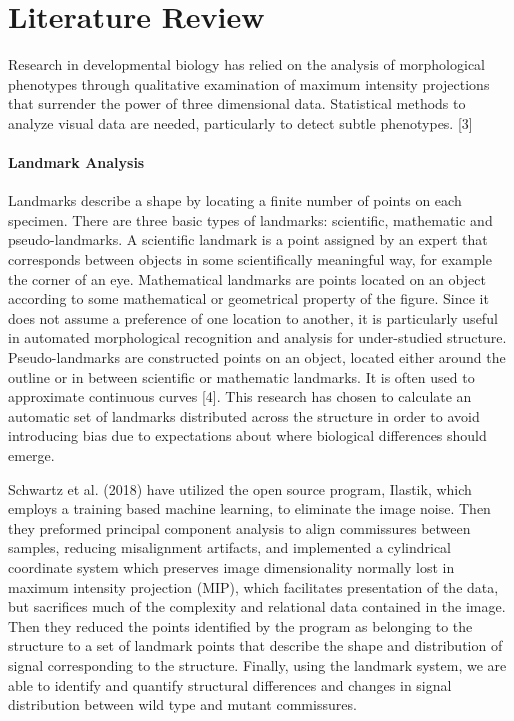 \documentclass[10pt,letterpaper]{article}
\begin{document}
\section{Literature Review}\label{literature-review}

Research in developmental biology has relied on the analysis of
morphological phenotypes through qualitative examination of maximum
intensity projections that surrender the power of three dimensional
data. Statistical methods to analyze visual data are needed,
particularly to detect subtle phenotypes. {[}3{]}

\paragraph{Landmark Analysis}\label{landmark-analysis-1}

Landmarks describe a shape by locating a finite number of points on each
specimen. There are three basic types of landmarks: scientific,
mathematic and pseudo-landmarks. A scientific landmark is a point
assigned by an expert that corresponds between objects in some
scientifically meaningful way, for example the corner of an eye.
Mathematical landmarks are points located on an object according to some
mathematical or geometrical property of the figure. Since it does not
assume a preference of one location to another, it is particularly
useful in automated morphological recognition and analysis for
under-studied structure. Pseudo-landmarks are constructed points on an
object, located either around the outline or in between scientific or
mathematic landmarks. It is often used to approximate continuous curves
{[}4{]}. This research has chosen to calculate an automatic set of
landmarks distributed across the structure in order to avoid introducing
bias due to expectations about where biological differences should
emerge.

Schwartz et al. (2018) have utilized the open source program, Ilastik,
which employs a training based machine learning, to eliminate the image
noise. Then they preformed principal component analysis to align
commissures between samples, reducing misalignment artifacts, and
implemented a cylindrical coordinate system which preserves image
dimensionality normally lost in maximum intensity projection (MIP),
which facilitates presentation of the data, but sacrifices much of the
complexity and relational data contained in the image. Then they reduced
the points identified by the program as belonging to the structure to a
set of landmark points that describe the shape and distribution of
signal corresponding to the structure. Finally, using the landmark
system, we are able to identify and quantify structural differences and
changes in signal distribution between wild type and mutant commissures.
\end{document}
